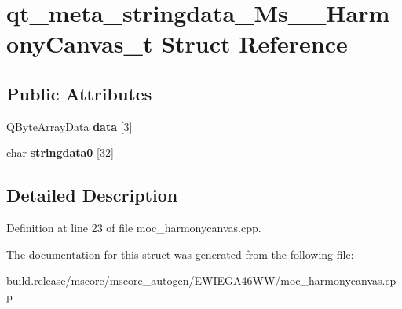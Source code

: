 \hypertarget{structqt__meta__stringdata___ms_____harmony_canvas__t}{}\section{qt\+\_\+meta\+\_\+stringdata\+\_\+\+Ms\+\_\+\+\_\+\+Harmony\+Canvas\+\_\+t Struct Reference}
\label{structqt__meta__stringdata___ms_____harmony_canvas__t}
\subsection*{Public Attributes}
\begin{DoxyCompactItemize}
\item 
\mbox{\label{structqt__meta__stringdata___ms_____harmony_canvas__t_ac6c1dc82fb398efa4dae526323359615}} 
Q\+Byte\+Array\+Data {\bfseries data} \mbox{[}3\mbox{]}
\item 
\mbox{\label{structqt__meta__stringdata___ms_____harmony_canvas__t_ac74e2d741f764b210cf4be68d15710f0}} 
char {\bfseries stringdata0} \mbox{[}32\mbox{]}
\end{DoxyCompactItemize}


\subsection{Detailed Description}


Definition at line 23 of file moc\+\_\+harmonycanvas.\+cpp.



The documentation for this struct was generated from the following file\+:\begin{DoxyCompactItemize}
\item 
build.\+release/mscore/mscore\+\_\+autogen/\+E\+W\+I\+E\+G\+A46\+W\+W/moc\+\_\+harmonycanvas.\+cpp\end{DoxyCompactItemize}

